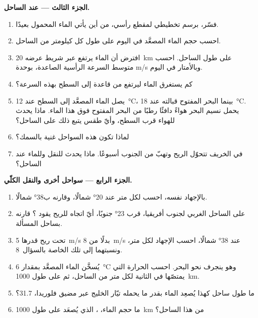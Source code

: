\begin{problem}
\medskip
\noindent\textbf{الجزء الثالث ---  عند الساحل.}
\begin{enumerate}[resume]
  \item فسّر، برسم تخطيطي لمقطع رأسي، من أين يأتي الماء المحمول بعيدًا.
  \item احسب حجم الماء المصعَّد في اليوم على طول كل كيلومتر من الساحل.
  \item افترض أن الماء يرتفع عبر شريط عرضه \qty{20}{km} على طول الساحل. احسب متوسط السرعة الرأسية الصاعدة، بوحدة \unit{m/s} وبالأمتار في اليوم.
  \item كم يستغرق الماء ليرتفع من قاعدة  إلى السطح بهذه السرعة؟
  \item يصل الماء المصعَّد إلى السطح عند \qty{12}{\celsius}، بينما البحر المفتوح قبالته عند \qty{18}{\celsius}. يحمل نسيم البحر هواءً دافئًا رطبًا من البحر المفتوح فوق هذا الماء. ماذا يحدث للهواء قرب السطح، وأيّ طقس يتبع ذلك على الساحل؟
  \item لماذا تكون هذه السواحل غنية بالسمك؟
  \item في الخريف تتحوّل الريح وتهبّ من الجنوب أسبوعًا. ماذا يحدث للنقل وللماء عند الساحل؟
\end{enumerate}

\medskip
\noindent\textbf{الجزء الرابع --- سواحل أخرى والنقل الكلّي.}
\begin{enumerate}[resume]
  \item بالإجهاد نفسه، احسب  لكل متر عند \ang{20} شمالًا، وقارنه ب\ang{38} شمالًا.
  \item على الساحل الغربي لجنوب أفريقيا، قرب \ang{23} جنوبًا، أيّ اتجاه للريح يقود ؟ قارنه بساحل المسألة.
  \item تحت ريح قدرها \qty{5}{m/s} بدلًا من \qty{8}{m/s} عند \ang{38} شمالًا، احسب الإجهاد  لكل متر، ونسبتهما إلى تلك الخاصة بالسؤال~8.
  \item يُسخَّن الماء المصعَّد بمقدار \qty{6}{\celsius} وهو ينجرف نحو البحر. احسب الحرارة التي يمتصّها في الثانية لكل متر من الساحل، ثم على طول \qty{1000}{km}.
  \item ما طول ساحل كهذا يُصعِد الماء بقدر ما يحمله تيّار الخليج عبر مضيق فلوريدا، \qty{31.7}{\sverdrup}؟
  \item ما حجم الماء، ، الذي يُصعَد على طول \qty{1000}{km} من هذا الساحل؟
\end{enumerate}
\end{problem}
